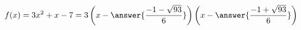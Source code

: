 \documentclass{ximera}
\author{Lee Wayand}
\begin{document}
\begin{example}








\begin{question}


\[
f(x) = 3x^2 + x - 7 = 3 \left( x - \answer{\frac{-1 - \sqrt{93}}{6}} \right) \left( x - \answer{\frac{-1 + \sqrt{93}}{6}} \right)
\]

\end{question}















\end{example}
\end{document}
